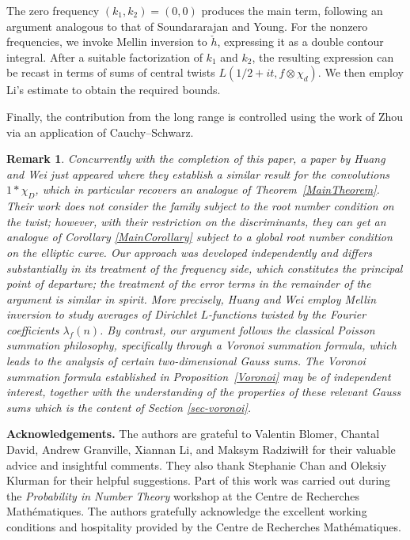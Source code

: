 \documentclass[12pt]{amsart}
\newtheorem{remark}[theorem]{Remark}
\begin{document}
The zero frequency $(k_1,k_2)=(0,0)$ produces the main term, following an argument analogous to that of Soundararajan and Young. For the nonzero frequencies, we invoke Mellin inversion to $\check{h}$, expressing it as a double contour integral. After a suitable factorization of $k_1$ and $k_2$, the resulting expression can be recast in terms of sums of central twists $L(1/2+it,f\otimes\chi_d)$. We then employ Li's estimate \cite{XLi} to obtain the required bounds.

Finally, the contribution from the long range is controlled using the work of Zhou \cite[Proposition~4.3]{zhou} via an application of Cauchy--Schwarz.



\begin{remark}
    Concurrently with the completion of this paper, a paper by Huang and Wei \cite{huang2026momentderivativeslfunctionsnonlinear} just appeared where they establish a similar result for the convolutions $1 * \chi_D$, which in particular recovers an analogue of Theorem~\ref{MainTheorem}. Their work does not consider the family subject to the root number condition on the twist; however, with their restriction on the discriminants, they can get an analogue of Corollary \ref{MainCorollary} subject to a global root number condition on the elliptic curve. Our approach was developed independently and differs substantially in its treatment of the frequency side, which constitutes the principal point of departure; the treatment of the error terms in the remainder of the argument is similar in spirit. More precisely, Huang and Wei employ Mellin inversion to study averages of Dirichlet $L$-functions twisted by the Fourier coefficients $\lambda_f(n)$. By contrast, our argument follows the classical Poisson summation philosophy, specifically through a Voronoi summation formula, which leads to the analysis of certain two-dimensional Gauss sums. The Voronoi summation formula established in Proposition~\ref{Voronoi} may be of independent interest, together with the understanding of the properties of these relevant Gauss sums which is the content of Section \ref{sec-voronoi}.
\end{remark}




\textbf{Acknowledgements.} The authors are grateful to Valentin Blomer, Chantal David, Andrew Granville, Xiannan Li, and Maksym Radziwi\l\l{} for their valuable advice and insightful comments. They also thank Stephanie Chan and Oleksiy Klurman for their helpful suggestions. Part of this work was carried out during the \emph{Probability in Number Theory} workshop at the Centre de Recherches Mathématiques. The authors gratefully acknowledge the excellent working conditions and hospitality provided by the Centre de Recherches Mathématiques.
\end{document}
